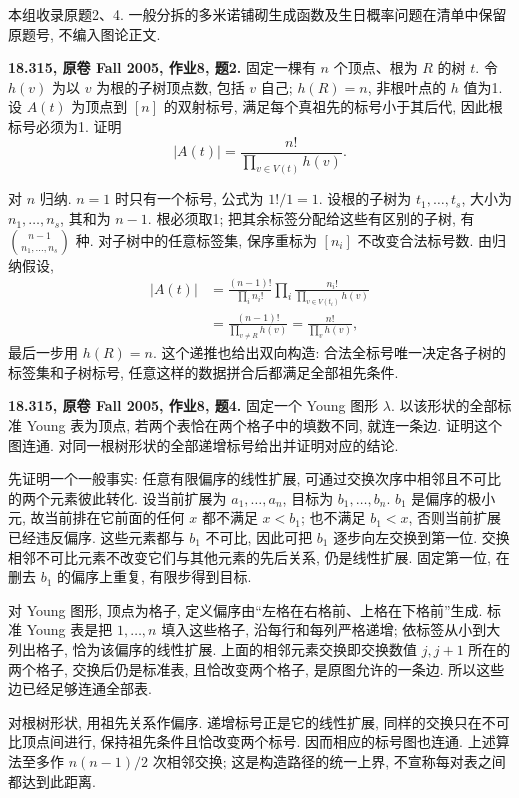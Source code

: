 本组收录原题2、4. 一般分拆的多米诺铺砌生成函数及生日概率问题在清单中保留原题号,
不编入图论正文.

\begin{exercise}\label{mit:18315-hw8-q2}
\textbf{18.315, 原卷 Fall 2005, 作业8, 题2.}
固定一棵有 $n$ 个顶点、根为 $R$ 的树 $t$.
令 $h(v)$ 为以 $v$ 为根的子树顶点数, 包括 $v$ 自己;
$h(R)=n$, 非根叶点的 $h$ 值为1.
设 $A(t)$ 为顶点到 $[n]$ 的双射标号, 满足每个真祖先的标号小于其后代,
因此根标号必须为1. 证明
\[
|A(t)|=\frac{n!}{\prod_{v\in V(t)}h(v)}.
\]
\end{exercise}
\begin{solution}
对 $n$ 归纳. $n=1$ 时只有一个标号, 公式为 $1!/1=1$.
设根的子树为 $t_1,\ldots,t_s$, 大小为 $n_1,\ldots,n_s$,
其和为 $n-1$. 根必须取1; 把其余标签分配给这些有区别的子树,
有 $\binom{n-1}{n_1,\ldots,n_s}$ 种.
对子树中的任意标签集, 保序重标为 $[n_i]$ 不改变合法标号数.
由归纳假设,
\begin{align*}
|A(t)|
&=\frac{(n-1)!}{\prod_i n_i!}
\prod_i\frac{n_i!}{\prod_{v\in V(t_i)}h(v)}\\
&=\frac{(n-1)!}{\prod_{v\ne R}h(v)}
=\frac{n!}{\prod_vh(v)},
\end{align*}
最后一步用 $h(R)=n$.
这个递推也给出双向构造: 合法全标号唯一决定各子树的标签集和子树标号,
任意这样的数据拼合后都满足全部祖先条件.
\end{solution}

\begin{exercise}\label{mit:18315-hw8-q4}
\textbf{18.315, 原卷 Fall 2005, 作业8, 题4.}
固定一个 Young 图形 $\lambda$.
以该形状的全部标准 Young 表为顶点, 若两个表恰在两个格子中的填数不同, 就连一条边.
证明这个图连通. 对同一根树形状的全部递增标号给出并证明对应的结论.
\end{exercise}
\begin{solution}
先证明一个一般事实: 任意有限偏序的线性扩展,
可通过交换次序中相邻且不可比的两个元素彼此转化.
设当前扩展为 $a_1,\ldots,a_n$, 目标为 $b_1,\ldots,b_n$.
$b_1$ 是偏序的极小元, 故当前排在它前面的任何 $x$ 都不满足 $x<b_1$;
也不满足 $b_1<x$, 否则当前扩展已经违反偏序.
这些元素都与 $b_1$ 不可比, 因此可把 $b_1$ 逐步向左交换到第一位.
交换相邻不可比元素不改变它们与其他元素的先后关系, 仍是线性扩展.
固定第一位, 在删去 $b_1$ 的偏序上重复, 有限步得到目标.

对 Young 图形, 顶点为格子, 定义偏序由“左格在右格前、上格在下格前”生成.
标准 Young 表是把 $1,\ldots,n$ 填入这些格子, 沿每行和每列严格递增;
依标签从小到大列出格子, 恰为该偏序的线性扩展.
上面的相邻元素交换即交换数值 $j,j+1$ 所在的两个格子,
交换后仍是标准表, 且恰改变两个格子, 是原图允许的一条边.
所以这些边已经足够连通全部表.

对根树形状, 用祖先关系作偏序.
递增标号正是它的线性扩展, 同样的交换只在不可比顶点间进行,
保持祖先条件且恰改变两个标号. 因而相应的标号图也连通.
上述算法至多作 $n(n-1)/2$ 次相邻交换;
这是构造路径的统一上界, 不宣称每对表之间都达到此距离.
\end{solution}
